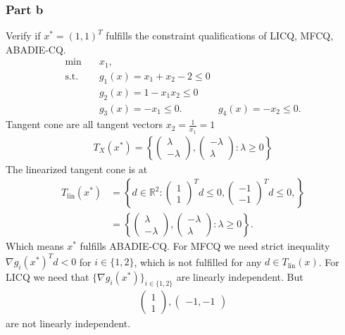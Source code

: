 \subsubsection{Part b}
Verify if $x^{*} = (1, 1)^{T}$ fulfills the constraint qualifications of
LICQ, MFCQ, ABADIE-CQ.
\begin{align}
    \text{min}\quad & x_1,\\
    \text{s.t.}\quad & g_1\left(x  \right) = x_1 + x_2 -2 \le 0 \nonumber\\
    &g_2(x) = 1-x_1x_2 \le 0 \nonumber\\
    &g_3(x) = -x_1 \le 0\nonumber.
    &g_4(x) = -x_2 \le 0\nonumber.
\end{align}
Tangent cone are all tangent vectors $x_2 = \frac{1}{x_1} = 1$
\begin{align}
    T_X(x^{*}) = \left\{
        \begin{pmatrix} \lambda\\-\lambda \end{pmatrix} ,
        \begin{pmatrix} -\lambda\\\lambda \end{pmatrix}
        : \lambda \ge 0
    \right\}
\end{align}
The linearized tangent cone is at
\begin{align}
    T_\text{lin} (x^{*}) &=
    \left\{ d \in \mathbb{R}^{2}:
        \begin{pmatrix}1\\1  \end{pmatrix}^{T}d \le 0,
        \begin{pmatrix}-1\\-1  \end{pmatrix}^{T}d \le 0,
    \right\} \\
    &=
    \left\{
        \begin{pmatrix} \lambda\\-\lambda \end{pmatrix} ,
        \begin{pmatrix} -\lambda\\\lambda \end{pmatrix}
        : \lambda \ge 0
    \right\}.
\end{align}
Which means $x^{*}$ fulfills ABADIE-CQ. For MFCQ we need strict inequality
$\nabla g_i (x^{*})^{T}d < 0$ for $i \in \{1, 2\}$, which is not fulfilled for any $d \in
T_\text{lin}(x)$. For LICQ we need that $\{\nabla g_i (x^{*})\}_{i\in \{1,
2\} }$ are linearly independent. But
\begin{align}
    \begin{pmatrix} 1\\1  \end{pmatrix} ,
    \begin{pmatrix} -1, -1 \end{pmatrix}
\end{align}
are not linearly independent.

